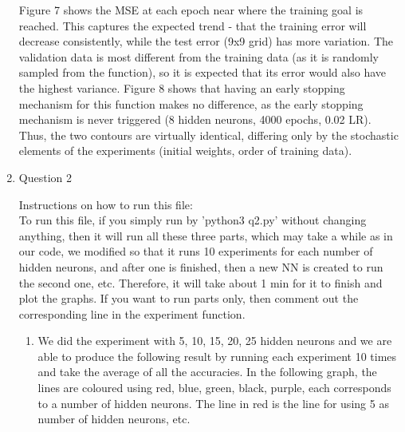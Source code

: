 \documentclass[11pt]{article}
\begin{document}
\begin{enumerate}
Figure 7 shows the MSE at each epoch near where the training goal is reached. This captures the expected trend - that the training error will decrease consistently, while the test error (9x9 grid) has more variation. The validation data is most different from the training data (as it is randomly sampled from the function), so it is expected that its error would also have the highest variance.\newline
Figure 8 shows that having an early stopping mechanism for this function makes no difference, as the early stopping mechanism is never triggered (8 hidden neurons, 4000 epochs, 0.02 LR). Thus, the two contours are virtually identical, differing only by the stochastic elements of the experiments (initial weights, order of training data). 


\item Question 2\newline

Instructions on how to run this file:\\
To run this file, if you simply run by 'python3 q2.py' without changing anything, then  it will run all these three parts, which may take a while as in our code, we modified so that it runs 10 experiments for each number of hidden neurons, and after one is finished, then a new NN is created to run the second one, etc. Therefore, it will take about 1 min for it to finish and plot the graphs. If you want to run parts only, then comment out the corresponding line in the experiment function.\\

% 
\begin{enumerate}
\item We did the experiment with 5, 10, 15, 20, 25 hidden neurons and we are able to produce the following result by running each experiment 10 times and take the average of all the accuracies. In the following graph, the lines are coloured using red, blue, green, black, purple, each corresponds to a number of hidden neurons. The line in red is the line for using 5 as number of hidden neurons, etc.\newline


\end{enumerate}
\end{enumerate}
\end{document}
